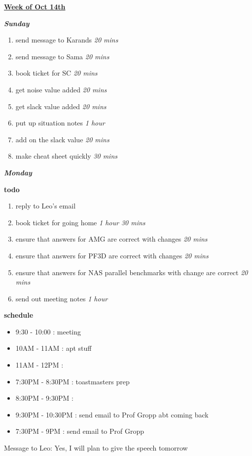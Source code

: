 \documentclass[11pt]{article}
\newcommand{\timeEst}[1]{\textit{#1}}
\begin{document}
\underline{\textbf{Week of Oct 14th}}

\textbf{\textit{Sunday}}
\begin{enumerate}
\item send message to Karands \timeEst{20 mins}
\item send message to Sama \timeEst{20 mins}
\item book ticket for SC \timeEst{20 mins}
\item get noise value added \timeEst{20 mins}
\item get slack value added \timeEst {20 mins}
\item put up situation notes \timeEst{1 hour}
\item add on the slack value \timeEst{20 mins}
\item make cheat sheet quickly \timeEst{ 30 mins}
\end{enumerate}

\textbf{\textit{Monday}}

\textbf{todo}
\begin{enumerate}
\item reply to Leo's email
\item book ticket for going home \timeEst{1 hour 30 mins}

\item ensure that answers for AMG are correct with changes \timeEst{20 mins}
\item ensure that answers for PF3D are correct with changes \timeEst{20 mins}
\item ensure that answers for NAS parallel benchmarks with change are correct \timeEst{20 mins}
\item send out meeting notes \timeEst{1 hour}
\end{enumerate}

\textbf{schedule}
\begin{itemize}
\item 9:30 - 10:00 : meeting
\item 10AM - 11AM : apt stuff
\item 11AM - 12PM :
\item 7:30PM - 8:30PM : toastmasters prep
\item 8:30PM - 9:30PM :
\item 9:30PM - 10:30PM : send email to Prof Gropp abt coming back
\item 7:30PM - 9PM : send email to Prof Gropp
\end{itemize}

Message to Leo: Yes, I will plan to give the speech tomorrow
\end{document}
